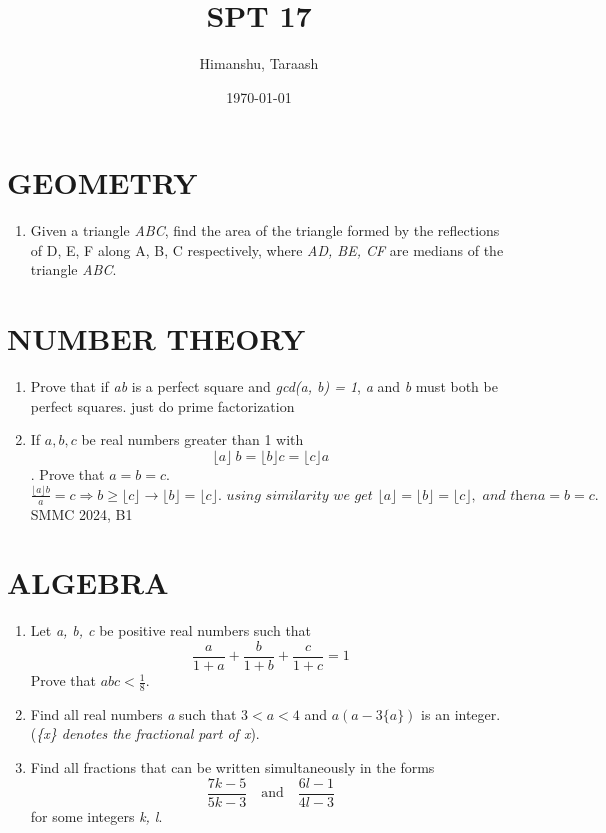 \documentclass[12pt, letterpaper]{article}
\title{\vspace{-2cm}SPT 17}
\author{Himanshu, Taraash}
\date{\today}
\begin{document}
\maketitle

\section{GEOMETRY}
\begin{enumerate}

    \item Given a triangle \emph{ABC}, find the area of the triangle formed by the reflections of D, E, F along A, B, C respectively, where \emph{AD, BE, CF} are medians of the triangle \emph{ABC}.
    
\end{enumerate}

\section{NUMBER THEORY}
\begin{enumerate}
  
    \item Prove that if \emph{ab} is a perfect square and \emph{gcd(a, b) = 1}, \emph{a} and \emph{b} must both be perfect squares. {\color{red} just do prime factorization}

    \item If \(a,b,c\) be real numbers greater than 1 with \[\lfloor a \rfloor\ b = \lfloor b \rfloor c = \lfloor c \rfloor a \].
    Prove that $a=b=c$. {\color{red} $\frac{\lfloor a\rfloor b}{a}=c \Rightarrow b \geq \lfloor c \rfloor \rightarrow \lfloor b \rfloor = \lfloor c \rfloor. \textit{ using similarity we get } \lfloor a \rfloor = \lfloor b \rfloor = \lfloor c \rfloor, \textit{ and then} a=b=c.  $} {\color{gray} SMMC 2024, B1}

\end{enumerate}


\section{ALGEBRA}
    
\begin{enumerate}
    
    \item Let \emph{a, b, c} be positive real numbers such that \[\frac{a}{1 + a} + \frac{b}{1+b} + \frac{c}{1 + c} = 1\]
    Prove that \(abc < \frac{1}{8}\).

    \item Find all real numbers \emph{a} such that \( 3 < a < 4\) and \( a(a - 3\{a\})\) is an integer. (\emph{\{x\} denotes the fractional part of x}).

    \item Find all fractions that can be written simultaneously in the forms 
    \[
    \frac{7k - 5}{5k - 3} \quad \text{and} \quad \frac{6l - 1}{4l - 3}
    \]
    for some integers \emph{k, l}.
    
\end{enumerate}
\end{document}
